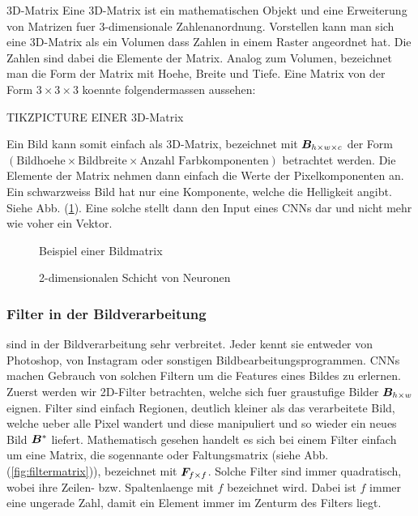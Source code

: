 \documentclass[../main]{subfiles}
\begin{document}
\begin{defbox}{3D-Matrix}
  Eine 3D-Matrix ist ein mathematischen Objekt und eine Erweiterung von Matrizen
  fuer 3-dimensionale Zahlenanordnung. Vorstellen kann man sich eine 3D-Matrix
  als ein Volumen dass Zahlen in einem Raster angeordnet hat.
  Die Zahlen sind dabei die Elemente der Matrix. Analog zum Volumen, bezeichnet
  man die Form der Matrix mit Hoehe, Breite und Tiefe.
  Eine Matrix von der Form $3 \times 3 \times 3$ koennte folgendermassen aussehen:

  TIKZPICTURE EINER 3D-Matrix

\end{defbox}

\para{}
Ein Bild kann somit einfach als 3D-Matrix, bezeichnet mit $\mat{B}_{h \times w
  \times c}$ der Form $(\text{Bildhoehe} \times
\text{Bildbreite} \times \text{Anzahl Farbkomponenten})$ betrachtet werden. Die
Elemente der Matrix nehmen dann einfach die Werte der Pixelkomponenten an.
Ein schwarzweiss Bild hat nur eine Komponente, welche die Helligkeit angibt.
Siehe Abb. (\ref{fig:bildmatrix}).
\para{}
Eine solche  stellt dann den Input eines CNNs dar und nicht mehr wie
voher ein Vektor.


\begin{figure}[h!]
  \begin{tikzpicture}

  \end{tikzpicture}
  \caption{Beispiel einer Bildmatrix}
  \label{fig:bildmatrix}
\end{figure}

\begin{figure}

  \caption{2-dimensionalen Schicht von Neuronen}
\end{figure}

\subsubsection{Filter in der Bildverarbeitung}
 sind in der Bildverarbeitung sehr verbreitet. Jeder kennt sie entweder
von Photoshop, von Instagram oder sonstigen Bildbearbeitungsprogrammen.
CNNs machen Gebrauch von solchen Filtern um die Features eines Bildes zu
erlernen. Zuerst werden wir 2D-Filter betrachten, welche sich fuer graustufige
Bilder $\mat{B}_{h \times w}$ eignen.
\para{}
Filter sind einfach Regionen, deutlich kleiner als das verarbeitete Bild, welche
ueber alle Pixel wandert und diese manipuliert und so wieder ein neues Bild
$\mat{B}^*$ liefert.
Mathematisch gesehen handelt es sich bei einem Filter einfach um eine Matrix,
die sogennante  oder Faltungsmatrix (siehe Abb. (\ref{fig:filtermatrix})),
bezeichnet mit $\mat{F}_{f \times f}$. Solche Filter sind immer quadratisch,
wobei ihre Zeilen- bzw. Spaltenlaenge mit $f$ bezeichnet wird. Dabei ist $f$
immer eine ungerade Zahl, damit ein Element immer im Zenturm des Filters liegt.
\end{document}
